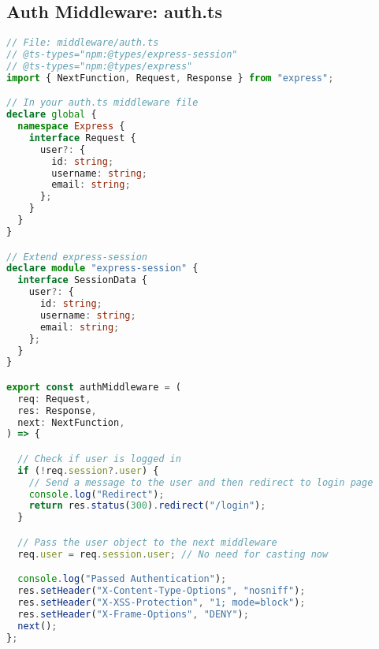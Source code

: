 \subsection{Auth Middleware: auth.ts}
\begin{lstlisting}[language=TypeScript]
// File: middleware/auth.ts
// @ts-types="npm:@types/express-session"
// @ts-types="npm:@types/express"
import { NextFunction, Request, Response } from "express";

// In your auth.ts middleware file
declare global {
  namespace Express {
    interface Request {
      user?: {
        id: string;
        username: string;
        email: string;
      };
    }
  }
}

// Extend express-session
declare module "express-session" {
  interface SessionData {
    user?: {
      id: string;
      username: string;
      email: string;
    };
  }
}

export const authMiddleware = (
  req: Request,
  res: Response,
  next: NextFunction,
) => {

  // Check if user is logged in
  if (!req.session?.user) {
    // Send a message to the user and then redirect to login page
    console.log("Redirect");
    return res.status(300).redirect("/login");
  }

  // Pass the user object to the next middleware
  req.user = req.session.user; // No need for casting now

  console.log("Passed Authentication");
  res.setHeader("X-Content-Type-Options", "nosniff");
  res.setHeader("X-XSS-Protection", "1; mode=block");
  res.setHeader("X-Frame-Options", "DENY");
  next();
};
\end{lstlisting}

